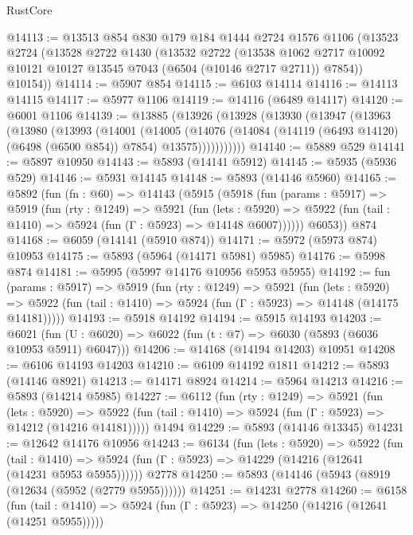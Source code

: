 \begin{lexlean}{RustCore}
\begin{coremodule}
@14113 := @13513
    @854
    @830
    @179
    @184
    @1444
    @2724
    @1576
    @1106
    (@13523
      @2724
      (@13528
        @2722
        @1430
        (@13532
          @2722
          (@13538 @1062 @2717 @10092 @10121 @10127 @13545 @7043 (@6504 (@10146 @2717 @2711)) @7854))
        @10154))
@14114 := @5907 @854
@14115 := @6103 @14114
@14116 := @14113 @14115
@14117 := @5977 @1106
@14119 := @14116 (@6489 @14117)
@14120 := @6001 @1106
@14139 := @13885
    (@13926
      (@13928
        (@13930
          (@13947
            (@13963
              (@13980
                (@13993
                  (@14001
                    (@14005
                      (@14076
                        (@14084 (@14119 (@6493 @14120) (@6498 (@6500 @854)) @7854) @13575)))))))))))
@14140 := @5889 @529
@14141 := @5897 @10950
@14143 := @5893 (@14141 @5912)
@14145 := @5935 (@5936 @529)
@14146 := @5931 @14145
@14148 := @5893 (@14146 @5960)
@14165 := @5892
    (fun (fn : @60) =>
    @14143
      (@5915
        (@5918
          (fun (params : @5917) =>
          @5919
            (fun (rty : @1249) =>
            @5921
              (fun (lets : @5920) =>
              @5922 (fun (tail : @1410) => @5924 (fun (Γ : @5923) => @14148 @6007))))))
        @6053))
    @874
@14168 := @6059 (@14141 (@5910 @874))
@14171 := @5972 (@5973 @874) @10953
@14175 := @5893 (@5964 (@14171 @5981) @5985)
@14176 := @5998 @874
@14181 := @5995 (@5997 @14176 @10956 @5953 @5955)
@14192 := fun (params : @5917) =>
  @5919
    (fun (rty : @1249) =>
    @5921
      (fun (lets : @5920) =>
      @5922 (fun (tail : @1410) => @5924 (fun (Γ : @5923) => @14148 (@14175 @14181)))))
@14193 := @5918 @14192
@14194 := @5915 @14193
@14203 := @6021
    (fun (U : @6020) => @6022 (fun (t : @7) => @6030 (@5893 (@6036 @10953 @5911) @6047)))
@14206 := @14168 (@14194 @14203) @10951
@14208 := @6106 @14193 @14203
@14210 := @6109 @14192 @1811
@14212 := @5893 (@14146 @8921)
@14213 := @14171 @8924
@14214 := @5964 @14213
@14216 := @5893 (@14214 @5985)
@14227 := @6112
    (fun (rty : @1249) =>
    @5921
      (fun (lets : @5920) =>
      @5922 (fun (tail : @1410) => @5924 (fun (Γ : @5923) => @14212 (@14216 @14181)))))
    @1494
@14229 := @5893 (@14146 @13345)
@14231 := @12642 @14176 @10956
@14243 := @6134
    (fun (lets : @5920) =>
    @5922
      (fun (tail : @1410) =>
      @5924 (fun (Γ : @5923) => @14229 (@14216 (@12641 (@14231 @5953 @5955))))))
    @2778
@14250 := @5893 (@14146 (@5943 (@8919 (@12634 (@5952 (@2779 @5955))))))
@14251 := @14231 @2778
@14260 := @6158
    (fun (tail : @1410) => @5924 (fun (Γ : @5923) => @14250 (@14216 (@12641 (@14251 @5955)))))

\end{coremodule}
\end{lexlean}
